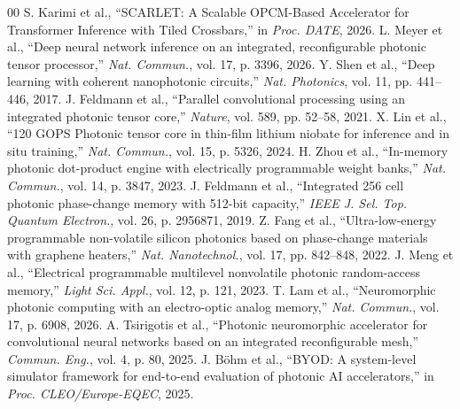 \documentclass[conference]{IEEEtran}
\begin{document}
\begin{thebibliography}{00}
 S. Karimi et al., ``SCARLET: A Scalable OPCM-Based Accelerator for Transformer Inference with Tiled Crossbars,'' in \textit{Proc. DATE}, 2026.
 L. Meyer et al., ``Deep neural network inference on an integrated, reconfigurable photonic tensor processor,'' \textit{Nat. Commun.}, vol. 17, p. 3396, 2026.
 Y. Shen et al., ``Deep learning with coherent nanophotonic circuits,'' \textit{Nat. Photonics}, vol. 11, pp. 441--446, 2017.
 J. Feldmann et al., ``Parallel convolutional processing using an integrated photonic tensor core,'' \textit{Nature}, vol. 589, pp. 52--58, 2021.
 X. Lin et al., ``120 GOPS Photonic tensor core in thin-film lithium niobate for inference and in situ training,'' \textit{Nat. Commun.}, vol. 15, p. 5326, 2024.
 H. Zhou et al., ``In-memory photonic dot-product engine with electrically programmable weight banks,'' \textit{Nat. Commun.}, vol. 14, p. 3847, 2023.
 J. Feldmann et al., ``Integrated 256 cell photonic phase-change memory with 512-bit capacity,'' \textit{IEEE J. Sel. Top. Quantum Electron.}, vol. 26, p. 2956871, 2019.
 Z. Fang et al., ``Ultra-low-energy programmable non-volatile silicon photonics based on phase-change materials with graphene heaters,'' \textit{Nat. Nanotechnol.}, vol. 17, pp. 842--848, 2022.
 J. Meng et al., ``Electrical programmable multilevel nonvolatile photonic random-access memory,'' \textit{Light Sci. Appl.}, vol. 12, p. 121, 2023.
 T. Lam et al., ``Neuromorphic photonic computing with an electro-optic analog memory,'' \textit{Nat. Commun.}, vol. 17, p. 6908, 2026.
 A. Tsirigotis et al., ``Photonic neuromorphic accelerator for convolutional neural networks based on an integrated reconfigurable mesh,'' \textit{Commun. Eng.}, vol. 4, p. 80, 2025.
 J. Böhm et al., ``BYOD: A system-level simulator framework for end-to-end evaluation of photonic AI accelerators,'' in \textit{Proc. CLEO/Europe-EQEC}, 2025.
\end{thebibliography}
\end{document}
